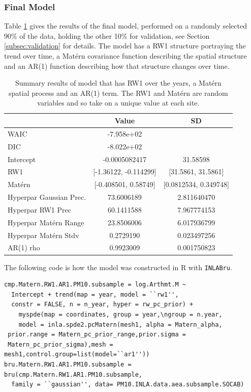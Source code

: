 \documentclass{article}
\begin{document}
\subsubsection*{Final Model} \label{seq:finalModel}

Table \ref{tab:model_INLA_full} gives the results of the final model, performed on a randomly selected 90\% of the data, holding the other 10\% for validation, see Section \ref{subsec:validation} for details.  The model has a \ac{RW}1 structure portraying the trend over time, a Mat\'{e}rn covariance function describing the spatial structure and an \ac{AR}(1) function describing how that structure changes over time.

\begin{table}[ht]
    \centering
    \begin{tabular}{l|c|c}
         & Value & SD  \\
         \hline
         WAIC & -7.958e+02   & \\
         DIC & -8.022e+02 & \\
         Intercept & -0.0005082417 & 31.58598  \\
         RW1 & [-1.36122, -0.114299] & [31.5861, 31.5861] \\
         Mat\'{e}rn & [-0.408501, 0.58749] & [0.0812534, 0.349748] \\
         Hyperpar Gaussian Prec. & 73.6006189  &  2.811640470 \\
         Hyperpar RW1 Prec & 60.1411588 & 7.967774153 \\ 
         Hyperpar Mat\'{e}rn Range & 23.8506006 & 6.017936799 \\
         Hyperpar Mat\'{e}rn Stdv & 0.2729190 & 0.023497256 \\
         AR(1) rho & 0.9923009 & 0.001750823 
    \end{tabular}
    \caption{Summary results of model that has RW1 over the years, a Mat\'{e}rn spatial process and an AR(1) term.   The RW1 and Mat\'{e}rn are random variables and so take on a unique value at each site. }
    \label{tab:model_INLA_full}
\end{table}

The following code is how the model was constructed in R with \lstinline{INLABru}.
\begin{lstlisting}
cmp.Matern.RW1.AR1.PM10.subsample = log.Arthmt.M ~ 
  Intercept + trend(map = year, model = ``rw1'', 
  constr = FALSE, n = n_year, hyper = rw_pc_prior) +
    myspde(map = coordinates, group = year,\ngroup = n.year,
    model = inla.spde2.pcMatern(mesh1, alpha = Matern_alpha,
 prior.range = Matern_pc_prior_range,prior.sigma = 
 Matern_pc_prior_sigma),mesh = mesh1,control.group=list(model=``ar1''))
bru.Matern.RW1.AR1.PM10.subsample = bru(cmp.Matern.RW1.AR1.PM10.subsample,             
  family = ``gaussian'', data= PM10.INLA.data.aea.subsample.SOCAB)
\end{lstlisting}
\end{document}
